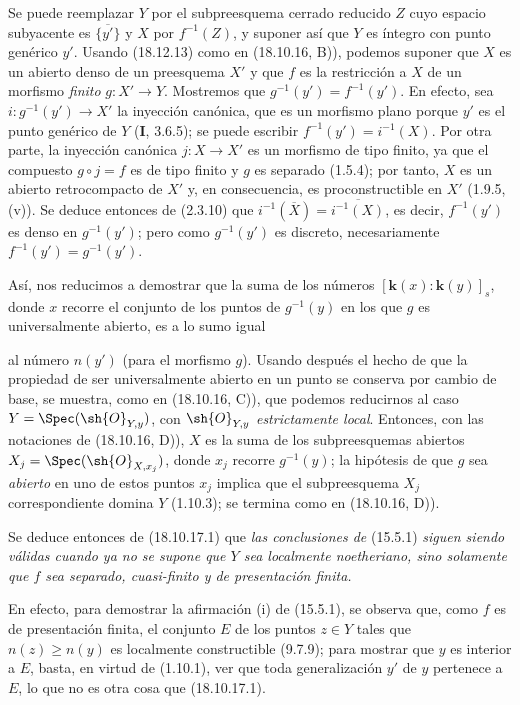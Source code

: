 Se puede reemplazar $Y$ por el subpreesquema cerrado reducido $Z$ cuyo espacio subyacente es $\overline{\{y'\}}$ y $X$ por $f^{-1}(Z)$, y suponer así que $Y$ es íntegro con punto genérico $y'$. Usando (18.12.13) como en (18.10.16, B)), podemos suponer que $X$ es un abierto denso de un preesquema $X'$ y que $f$ es la restricción a $X$ de un morfismo \emph{finito} $g:X'\to Y$. Mostremos que $g^{-1}(y')=f^{-1}(y')$. En efecto, sea $i:g^{-1}(y')\to X'$ la inyección canónica, que es un morfismo plano porque $y'$ es el punto genérico de $Y$ (\textbf I, 3.6.5); se puede escribir $f^{-1}(y')=i^{-1}(X)$. Por otra parte, la inyección canónica $j:X\to X'$ es un morfismo de tipo finito, ya que el compuesto $g\circ j=f$ es de tipo finito y $g$ es separado (1.5.4); por tanto, $X$ es un abierto retrocompacto de $X'$ y, en consecuencia, es proconstructible en $X'$ (1.9.5, (v)). Se deduce entonces de (2.3.10) que $i^{-1}(\overline{X})=\overline{i^{-1}(X)}$, es decir, $f^{-1}(y')$ es denso en $g^{-1}(y')$; pero como $g^{-1}(y')$ es discreto, necesariamente $f^{-1}(y')=g^{-1}(y')$.

Así, nos reducimos a demostrar que la suma de los números $[\boldsymbol k(x):\boldsymbol k(y)]_s$, donde $x$ recorre el conjunto de los puntos de $g^{-1}(y)$ en los que $g$ es universalmente abierto, es a lo sumo igual


al número $n(y')$ (para el morfismo $g$). Usando después el hecho de que la propiedad de ser universalmente abierto en un punto se conserva por cambio de base, se muestra, como en (18.10.16, C)), que podemos reducirnos al caso $Y=\Spec(\sh{O}_{Y,y})$, con $\sh{O}_{Y,y}$ \emph{estrictamente local}. Entonces, con las notaciones de (18.10.16, D)), $X$ es la suma de los subpreesquemas abiertos $X_j=\Spec(\sh{O}_{X,x_j})$, donde $x_j$ recorre $g^{-1}(y)$; la hipótesis de que $g$ sea \emph{abierto} en uno de estos puntos $x_j$ implica que el subpreesquema $X_j$ correspondiente domina $Y$ (1.10.3); se termina como en (18.10.16, D)).

Se deduce entonces de (18.10.17.1) que \emph{las conclusiones de} (15.5.1) \emph{siguen siendo válidas cuando ya no se supone que $Y$ sea localmente noetheriano, sino solamente que $f$ sea separado, cuasi-finito y de presentación finita.}

En efecto, para demostrar la afirmación (i) de (15.5.1), se observa que, como $f$ es de presentación finita, el conjunto $E$ de los puntos $z\in Y$ tales que $n(z)\geq n(y)$ es localmente constructible (9.7.9); para mostrar que $y$ es interior a $E$, basta, en virtud de (1.10.1), ver que toda generalización $y'$ de $y$ pertenece a $E$, lo que no es otra cosa que (18.10.17.1).


